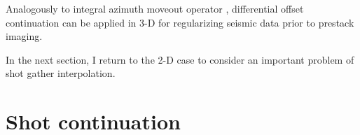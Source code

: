

Analogously to integral azimuth moveout operator
\cite[]{GEO63-02-05740588}, differential offset continuation can be
applied in 3-D for regularizing seismic data prior to prestack imaging.

  
  In the next section, I return to the 2-D case to consider an
  important problem of shot gather interpolation.

  \section{Shot continuation}
  
